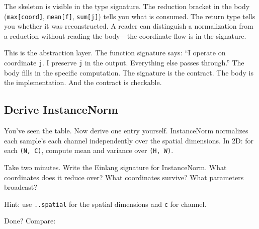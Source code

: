\documentclass[11pt,titlepage]{article}
\begin{document}
The skeleton is visible in the type signature. The reduction bracket in
the body (\texttt{max{[}coord{]}}, \texttt{mean{[}f{]}},
\texttt{sum{[}j{]}}) tells you what is consumed. The return type tells
you whether it was reconstructed. A reader can distinguish a
normalization from a reduction without reading the body---the coordinate
flow is in the signature.

This is the abstraction layer. The function signature says: ``I operate
on coordinate \texttt{j}. I preserve \texttt{j} in the output.
Everything else passes through.'' The body fills in the specific
computation. The signature is the contract. The body is the
implementation. And the contract is checkable.

\vspace{2em}

\hypertarget{derive-instancenorm}{%
\subsection{Derive InstanceNorm}\label{derive-instancenorm}}

You've seen the table. Now derive one entry yourself. InstanceNorm
normalizes each sample's each channel independently over the spatial
dimensions. In 2D: for each \texttt{(N,\ C)}, compute mean and variance
over \texttt{(H,\ W)}.

Take two minutes. Write the Einlang signature for InstanceNorm. What
coordinates does it reduce over? What coordinates survive? What
parameters broadcast?

Hint: use \texttt{..spatial} for the spatial dimensions and \texttt{c}
for channel.

\vspace{2em}

Done? Compare:
\end{document}
